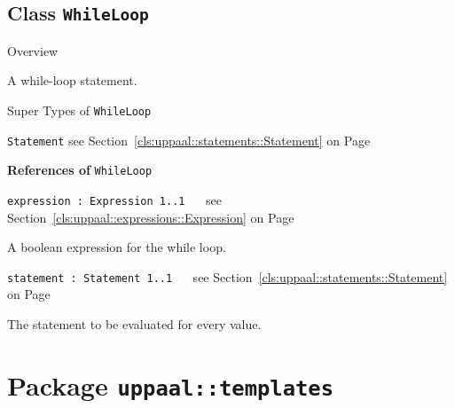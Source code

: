 \subsection{Class \bfseries \texttt{WhileLoop}\normalfont}
\label{cls:uppaal::statements::WhileLoop} 
	
	\begin{longdescription}
		\item[Overview] 		
				

	

		A while-loop statement.		
		\item[Super Types of \texttt{WhileLoop}] ~
			\begin{longdescription}
				\item[\texttt{Statement}] see Section~\ref{cls:uppaal::statements::Statement} on Page~\pageref{cls:uppaal::statements::Statement}						\end{longdescription}
		
	
			\item[\textbf{References of} \texttt{WhileLoop}] ~
			\begin{longdescription}
	\item[\texttt{expression : Expression 	\symbol{"5B}1..1\symbol{"5D}
}] ~
	see Section~\ref{cls:uppaal::expressions::Expression} on Page~\pageref{cls:uppaal::expressions::Expression}
	
	\nopagebreak
		
				

	

		A boolean expression for the while loop.		
	\item[\texttt{statement : Statement 	\symbol{"5B}1..1\symbol{"5D}
}] ~
	see Section~\ref{cls:uppaal::statements::Statement} on Page~\pageref{cls:uppaal::statements::Statement}
	
	\nopagebreak
		
				

	

		The statement to be evaluated for every value.		
			\end{longdescription}
	
	\end{longdescription}
	
			\newpage
		\section{Package \bfseries \texttt{uppaal::templates}\normalfont}
		
